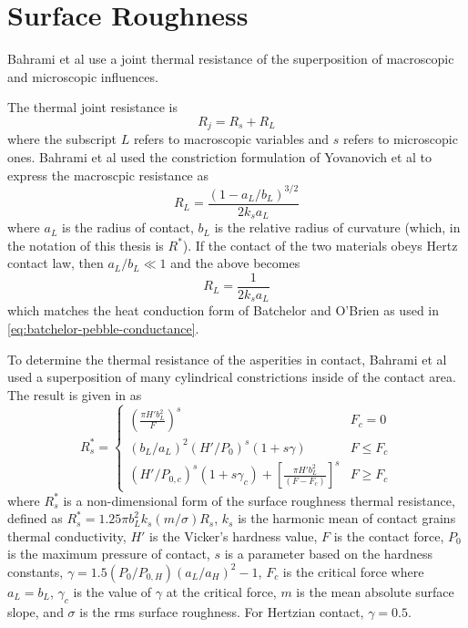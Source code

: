 \chapter{Surface Roughness}
Bahrami et al use a joint thermal resistance of the superposition of macroscopic and microscopic influences.\cite{Bahrami2004}

The thermal joint resistance is
\begin{equation}
	R_j = R_s + R_L
\end{equation}
where the subscript $L$ refers to macroscopic variables and $s$ refers to microscopic ones. Bahrami et al used the constriction formulation of Yovanovich et al to express the macroscpic resistance as\cite{Yovanovich1976}
\begin{equation}
	R_L = \frac{(1-a_L/b_L)^{3/2}}{2k_sa_L}
\end{equation}
where $a_L$ is the radius of contact, $b_L$ is the relative radius of curvature (which, in the notation of this thesis is $R^*$). If the contact of the two materials obeys Hertz contact law, then $a_L/b_L \ll 1$ and the above becomes
\begin{equation}\label{eq:macro-thermal-resistance}
	R_L = \frac{1}{2k_sa_L}
\end{equation}
which matches the heat conduction form of Batchelor and O'Brien\cite{Batchelor1977} as used in \cref{eq:batchelor-pebble-conductance}.

To determine the thermal resistance of the asperities in contact, Bahrami et al used a superposition of many cylindrical constrictions inside of the contact area. The result is given in \cite{Bahrami2004} as
\begin{equation}
	R_s^* = \begin{cases}
	\left(\frac{\pi H'b_L^2}{F} \right)^s 										& F_c = 0\\
	(b_L/a_L)^2(H'/P_0)^s(1+s\gamma) 										& F \le F_c\\
	(H'/P_{0,c})^s(1+s\gamma_c)+\left[\frac{\pi H'b_L^2}{(F-F_c)}\right]^s				& F\ge F_c
	\end{cases}
\end{equation}
where $R_s^*$ is a non-dimensional form of the surface roughness thermal resistance, defined as $R_s^* = 1.25\pi b_L^2k_s(m/\sigma)R_s$, $k_s$ is the harmonic mean of contact grains thermal conductivity, $H'$ is the Vicker's hardness value, $F$ is the contact force, $P_0$ is the maximum pressure of contact, $s$ is a parameter based on the hardness constants, $\gamma = 1.5(P_0/P_{0,H})(a_L/a_H)^2-1$, $F_c$ is the critical force where $a_L = b_L$, $\gamma_c$ is the value of $\gamma$ at the critical force, $m$ is the mean absolute surface slope, and $\sigma$ is the rms surface roughness. For Hertzian contact, $\gamma = 0.5$.


